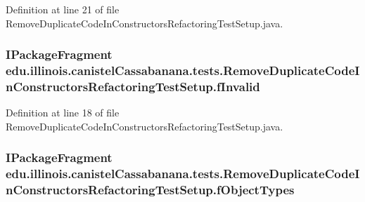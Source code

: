Definition at line 21 of file RemoveDuplicateCodeInConstructorsRefactoringTestSetup.java.

\hypertarget{classedu_1_1illinois_1_1canistelCassabanana_1_1tests_1_1RemoveDuplicateCodeInConstructorsRefactoringTestSetup_a421cc733d2ba660b2cbc1ffb94b6ba5c}{
\subsubsection[{fInvalid}]{\setlength{\rightskip}{0pt plus 5cm}IPackageFragment {\bf edu.illinois.canistelCassabanana.tests.RemoveDuplicateCodeInConstructorsRefactoringTestSetup.fInvalid}}}
\label{classedu_1_1illinois_1_1canistelCassabanana_1_1tests_1_1RemoveDuplicateCodeInConstructorsRefactoringTestSetup_a421cc733d2ba660b2cbc1ffb94b6ba5c}


Definition at line 18 of file RemoveDuplicateCodeInConstructorsRefactoringTestSetup.java.

\hypertarget{classedu_1_1illinois_1_1canistelCassabanana_1_1tests_1_1RemoveDuplicateCodeInConstructorsRefactoringTestSetup_abe1fbe53e3d90f623a37cc5c933145dc}{
\subsubsection[{fObjectTypes}]{\setlength{\rightskip}{0pt plus 5cm}IPackageFragment {\bf edu.illinois.canistelCassabanana.tests.RemoveDuplicateCodeInConstructorsRefactoringTestSetup.fObjectTypes}}}
\label{classedu_1_1illinois_1_1canistelCassabanana_1_1tests_1_1RemoveDuplicateCodeInConstructorsRefactoringTestSetup_abe1fbe53e3d90f623a37cc5c933145dc}



